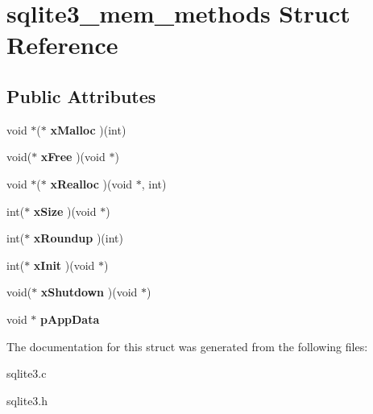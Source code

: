 \hypertarget{structsqlite3__mem__methods}{\section{sqlite3\-\_\-mem\-\_\-methods Struct Reference}
\label{structsqlite3__mem__methods}
}
\subsection*{Public Attributes}
\begin{DoxyCompactItemize}
\item 
\hypertarget{structsqlite3__mem__methods_acb9151cf501c851b61ab6b378832b159}{void $\ast$($\ast$ {\bfseries x\-Malloc} )(int)}\label{structsqlite3__mem__methods_acb9151cf501c851b61ab6b378832b159}

\item 
\hypertarget{structsqlite3__mem__methods_aa2e7fe8d030adaa17fd23a44fec1eca1}{void($\ast$ {\bfseries x\-Free} )(void $\ast$)}\label{structsqlite3__mem__methods_aa2e7fe8d030adaa17fd23a44fec1eca1}

\item 
\hypertarget{structsqlite3__mem__methods_a5bb7e62164d0934888473c618c61dc77}{void $\ast$($\ast$ {\bfseries x\-Realloc} )(void $\ast$, int)}\label{structsqlite3__mem__methods_a5bb7e62164d0934888473c618c61dc77}

\item 
\hypertarget{structsqlite3__mem__methods_a6c68275b577d66ae659ef30344c8f86c}{int($\ast$ {\bfseries x\-Size} )(void $\ast$)}\label{structsqlite3__mem__methods_a6c68275b577d66ae659ef30344c8f86c}

\item 
\hypertarget{structsqlite3__mem__methods_a8b3f0d1ddeb498c4aaf9bbce5b92a268}{int($\ast$ {\bfseries x\-Roundup} )(int)}\label{structsqlite3__mem__methods_a8b3f0d1ddeb498c4aaf9bbce5b92a268}

\item 
\hypertarget{structsqlite3__mem__methods_ad0997b548928358d655000b6ac825cf4}{int($\ast$ {\bfseries x\-Init} )(void $\ast$)}\label{structsqlite3__mem__methods_ad0997b548928358d655000b6ac825cf4}

\item 
\hypertarget{structsqlite3__mem__methods_a6f48100692bd935d7f3dbb8c701ab6ca}{void($\ast$ {\bfseries x\-Shutdown} )(void $\ast$)}\label{structsqlite3__mem__methods_a6f48100692bd935d7f3dbb8c701ab6ca}

\item 
\hypertarget{structsqlite3__mem__methods_af91b7adfa1f6aace0b129bac800bd444}{void $\ast$ {\bfseries p\-App\-Data}}\label{structsqlite3__mem__methods_af91b7adfa1f6aace0b129bac800bd444}

\end{DoxyCompactItemize}


The documentation for this struct was generated from the following files\-:\begin{DoxyCompactItemize}
\item 
sqlite3.\-c\item 
sqlite3.\-h\end{DoxyCompactItemize}
